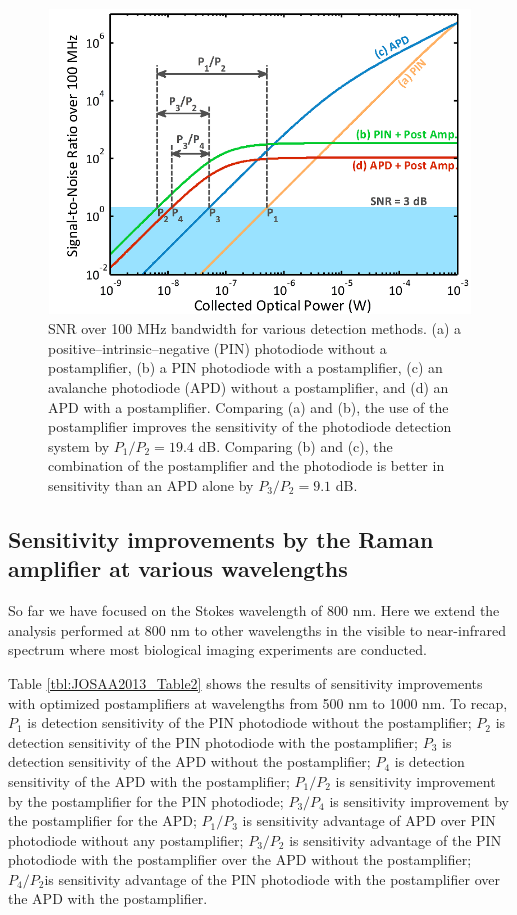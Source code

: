 \begin{figure}[htb!]
\centering
\includegraphics[scale=1]{JOSAA2013/Figure4.png}
\caption{SNR over 100 MHz bandwidth for various detection methods. (a) a positive–intrinsic–negative (PIN) photodiode without a postamplifier, (b) a PIN photodiode with a postamplifier, (c) an avalanche photodiode (APD) without a postamplifier, and (d) an APD with a postamplifier. Comparing (a) and (b), the use of the postamplifier improves the sensitivity of the photodiode detection system by $P_1/P_2 = 19.4$ dB. Comparing (b) and (c), the combination of the postamplifier and the photodiode is better in sensitivity than an APD alone by $P_3 / P_2 = 9.1$ dB.}
\label{fig:JOSAA2013_Figure4}
\end{figure}

\subsection{Sensitivity improvements by the Raman amplifier at various wavelengths}

So far we have focused on the Stokes wavelength of 800 nm. Here we extend the analysis performed at 800 nm to other wavelengths in the visible to near-infrared spectrum where most biological imaging experiments are conducted.

Table \ref{tbl:JOSAA2013_Table2} shows the results of sensitivity improvements with optimized postamplifiers at wavelengths from 500 nm to 1000 nm. To recap, $P_1$ is detection sensitivity of the PIN photodiode without the postamplifier; $P_2$ is detection sensitivity of the PIN photodiode with the postamplifier; $P_3$ is detection sensitivity of the APD without the postamplifier; $P_4$ is detection sensitivity of the APD with the postamplifier; $P_1/P_2$ is sensitivity improvement by the postamplifier for the PIN photodiode; $P_3/P_4$ is sensitivity improvement by the postamplifier for the APD; $P_1/P_3$ is sensitivity advantage of APD over PIN photodiode without any postamplifier; $P_3/P_2$ is sensitivity advantage of the PIN photodiode with the postamplifier over the APD without the postamplifier; $P_4/P_2$is sensitivity advantage of the PIN photodiode with the postamplifier over the APD with the postamplifier.


